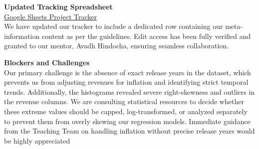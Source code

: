 \documentclass[10pt,a4paper]{article}
\begin{document}
\textbf{Updated Tracking Spreadsheet}\\
\href{https://docs.google.com/spreadsheets/d/1Uq2D5MdjAsLFLXG8qR6Nv4SFCqRq0ZuyhnNrdCJzuk0/edit?usp=sharing}{Google Sheets Project Tracker}\\
We have updated our tracker to include a dedicated row containing our meta-information content as per the guidelines. Edit
access has been fully verified and granted to our mentor, Avadh Hindocha, ensuring seamless collaboration.

\textbf{Blockers and Challenges}\\
Our primary challenge is the absence of exact release years in the dataset, which prevents us from adjusting revenues for
inflation and identifying strict temporal trends. Additionally, the histograms revealed severe right-skewness and outliers
in the revenue columns. We are consulting statistical resources to decide whether these extreme values should be capped,
log-transformed, or analyzed separately to prevent them from overly skewing our regression models. Immediate guidance
from the Teaching Team on handling inflation without precise release years would be highly appreciated
\end{document}
